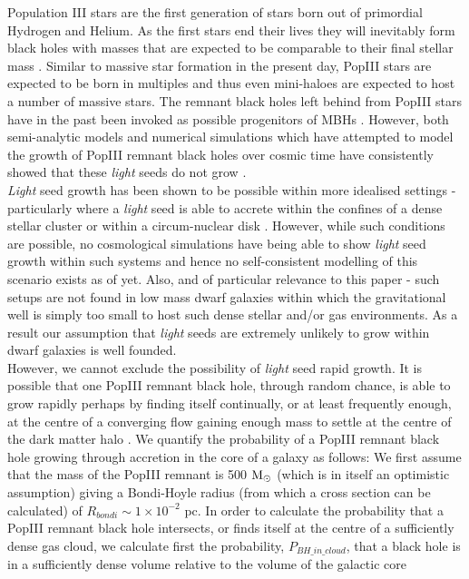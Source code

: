 \documentclass[twocolumn, tighten]{aastex631}
\newcommand{\msolar} {$\rm{M_{\odot}}~$}
\begin{document}
\noindent Population III stars are the first generation of stars born out of primordial Hydrogen and Helium. As the first stars end their lives they will inevitably form black holes with masses that 
are expected to be comparable to their final stellar mass \citep{Heger_2003}. Similar to massive star formation in the present day, PopIII stars are expected to be born in multiples \citep{Clark_2008, Turk_2009, Clark_2011, Clark_2011a} and thus even mini-haloes are expected to host a number of massive stars. The remnant black holes left behind from PopIII stars have in the past been invoked as possible progenitors of MBHs \citep{Madau_2001}. However, both semi-analytic models and numerical simulations which have attempted to model the growth of PopIII remnant black holes over cosmic time have consistently showed that these \textit{light} seeds do not grow \citep{Volonteri_2008, Alvarez_2009, Smith_2018}.\\
\indent \textit{Light} seed growth has been shown to be possible within more idealised settings - particularly where a \textit{light} seed is able to accrete within the confines of a 
dense stellar cluster \citep[e.g.][]{Alexander_2014, Natarajan_2021} or within a circum-nuclear disk \citep{Lupi_2016}. However, while such conditions are possible, no cosmological
simulations have being able to show \textit{light} seed growth within such systems and hence no self-consistent modelling of this scenario exists as of yet. Also, and of particular relevance to this paper - such setups are not found in low mass dwarf galaxies within which the gravitational well is simply too small to host such dense stellar and/or gas 
environments. As a result our assumption
that \textit{light} seeds are extremely unlikely to grow within dwarf galaxies is well founded. \\
\indent However, we cannot exclude the possibility of \textit{light} seed rapid growth. It is possible that one PopIII remnant black hole, through random chance, is able to grow rapidly perhaps by finding itself continually, or at least frequently enough, at the centre of a converging flow gaining enough mass to settle at the centre of the dark matter halo \citep{Pfister_2019}. We quantify the probability of a PopIII remnant black hole growing through accretion in the core of a galaxy as follows:
We first assume that the mass of the PopIII remnant is 500 \msolar (which is in itself an optimistic assumption) giving a Bondi-Hoyle radius (from which a cross section can be calculated) of $R_{bondi} \sim 1 \times 10^{-2}$ pc. In order to calculate the probability that a PopIII remnant black hole intersects, or finds itself at the centre of a sufficiently dense gas cloud, we calculate first the probability, $P_{BH\_in\_cloud}$, that a black hole is in a sufficiently dense volume relative to the volume of the galactic core
\end{document}
